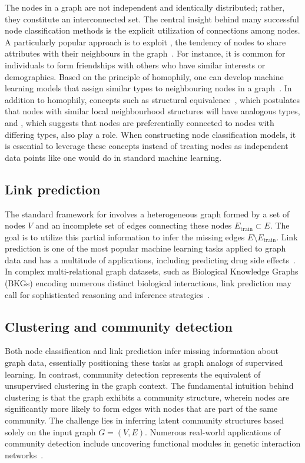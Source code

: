 The nodes in a graph are not independent and identically distributed; rather, they constitute an interconnected set. The central insight behind many successful node classification methods is the explicit utilization of connections among nodes. A particularly popular approach is to exploit , the tendency of nodes to share attributes with their neighbours in the graph~\cite{Mcpherson2001homophilyInSocialNw}. For instance, it is common for individuals to form friendships with others who have similar interests or demographics. Based on the principle of homophily, one can develop machine learning models that assign similar types to neighbouring nodes in a graph~\cite{Zhou2003LearningLocalGlobalConsistency}. In addition to homophily, concepts such as structural equivalence~\cite{Donnat2017GraphWaveletsStructuralRoleSimilarityComplexNws}, which postulates that nodes with similar local neighbourhood structures will have analogous types, and , which suggests that nodes are preferentially connected to nodes with differing types, also play a role. When constructing node classification models, it is essential to leverage these concepts instead of treating nodes as independent data points like one would do in standard machine learning.

\subsection{Link prediction}
The standard framework for  involves a heterogeneous graph formed by a set of nodes $ V $ and an incomplete set of edges connecting these nodes $ E_\text{train} \subset E $. The goal is to utilize this partial information to infer the missing edges $ E \setminus E_\text{train} $. Link prediction is one of the most popular machine learning tasks applied to graph data and has a multitude of applications, including predicting drug side effects~\cite{Zitnik2018ModelingPolypharmacySideEffectsGCN}. In complex multi-relational graph datasets, such as Biological Knowledge Graphs (BKGs) encoding numerous distinct biological interactions, link prediction may call for sophisticated reasoning and inference strategies~\cite{Nickel2015ReviewRelationalMLKG}.

\subsection{Clustering and community detection}
Both node classification and link prediction infer missing information about graph data, essentially positioning these tasks as graph analogs of supervised learning. In contrast, community detection represents the equivalent of unsupervised clustering in the graph context. The fundamental intuition behind clustering is that the graph exhibits a community structure, wherein nodes are significantly more likely to form edges with nodes that are part of the same community. The challenge lies in inferring latent community structures based solely on the input graph $ G = (V, E) $. Numerous real-world applications of community detection include uncovering functional modules in genetic interaction networks~\cite{Agrawal2018LargeScaleAnalysisDiseasePathwaysHumanInteractome}.

